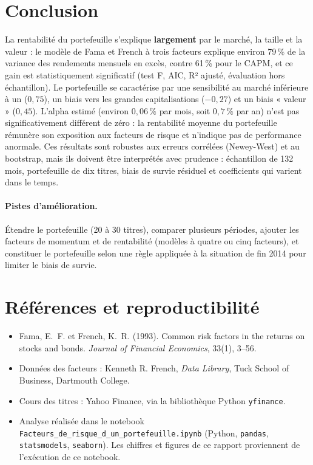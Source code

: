\documentclass[11pt,a4paper]{article}
\begin{document}
\section{Conclusion}

La rentabilité du portefeuille s'explique \textbf{largement} par le marché, la taille et la valeur : le modèle de Fama et French à trois facteurs explique environ 79\,\% de la variance des rendements mensuels en excès, contre 61\,\% pour le CAPM, et ce gain est statistiquement significatif (test F, AIC, R² ajusté, évaluation hors échantillon). Le portefeuille se caractérise par une sensibilité au marché inférieure à un ($0{,}75$), un biais vers les grandes capitalisations ($-0{,}27$) et un biais « valeur » ($0{,}45$). L'alpha estimé (environ $0{,}06\,\%$ par mois, soit $0{,}7\,\%$ par an) n'est pas significativement différent de zéro : la rentabilité moyenne du portefeuille rémunère son exposition aux facteurs de risque et n'indique pas de performance anormale. Ces résultats sont robustes aux erreurs corrélées (Newey-West) et au bootstrap, mais ils doivent être interprétés avec prudence : échantillon de 132 mois, portefeuille de dix titres, biais de survie résiduel et coefficients qui varient dans le temps.

\paragraph{Pistes d'amélioration.} Étendre le portefeuille (20 à 30 titres), comparer plusieurs périodes, ajouter les facteurs de momentum et de rentabilité (modèles à quatre ou cinq facteurs), et constituer le portefeuille selon une règle appliquée à la situation de fin 2014 pour limiter le biais de survie.

\section*{Références et reproductibilité}
\begin{itemize}
  \item Fama, E.~F. et French, K.~R. (1993). Common risk factors in the returns on stocks and bonds. \emph{Journal of Financial Economics}, 33(1), 3--56.
  \item Données des facteurs : Kenneth R. French, \emph{Data Library}, Tuck School of Business, Dartmouth College.
  \item Cours des titres : Yahoo Finance, via la bibliothèque Python \texttt{yfinance}.
  \item Analyse réalisée dans le notebook \texttt{Facteurs\_de\_risque\_d\_un\_portefeuille.ipynb} (Python, \texttt{pandas}, \texttt{statsmodels}, \texttt{seaborn}). Les chiffres et figures de ce rapport proviennent de l'exécution de ce notebook.
\end{itemize}
\end{document}
